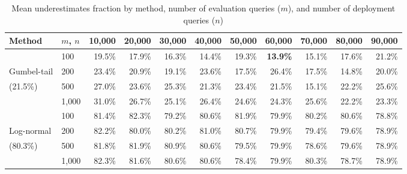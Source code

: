 \begin{table}[h]
\centering
\begin{tabular}{llrrrrrrrrr}
\toprule
Method & $m$, $n$ & 10,000 & 20,000 & 30,000 & 40,000 & 50,000 & 60,000 & 70,000 & 80,000 & 90,000 \\
\midrule
 & 100 & 19.5\% & 17.9\% & 16.3\% & 14.4\% & 19.3\% & \textbf{13.9\%} & 15.1\% & 17.6\% & 21.2\% \\
Gumbel-tail & 200 & 23.4\% & 20.9\% & 19.1\% & 23.6\% & 17.5\% & 26.4\% & 17.5\% & 14.8\% & 20.0\% \\
(21.5\%) & 500 & 27.0\% & 23.6\% & 25.3\% & 21.3\% & 23.4\% & 21.5\% & 15.1\% & 22.2\% & 25.6\% \\
& 1,000 & 31.0\% & 26.7\% & 25.1\% & 26.4\% & 24.6\% & 24.3\% & 25.6\% & 22.2\% & 23.3\% \\
\midrule
 & 100 & 81.4\% & 82.3\% & 79.2\% & 80.6\% & 81.9\% & 79.9\% & 80.2\% & 80.6\% & 78.8\% \\
Log-normal & 200 & 82.2\% & 80.0\% & 80.2\% & 81.0\% & 80.7\% & 79.9\% & 79.4\% & 79.6\% & 78.9\% \\
(80.3\%) & 500 & 81.8\% & 81.9\% & 80.9\% & 80.6\% & 79.5\% & 79.9\% & 78.6\% & 79.6\% & 78.9\% \\
& 1,000 & 82.3\% & 81.6\% & 80.6\% & 80.6\% & 78.4\% & 79.9\% & 80.3\% & 78.7\% & 78.9\% \\
\bottomrule
\end{tabular}
\caption{Mean underestimates fraction by method, number of evaluation queries ($m$), and number of deployment queries ($n$)}
\end{table}



